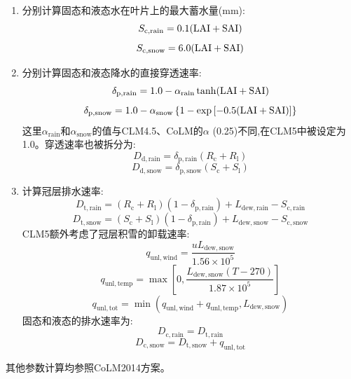 \begin{enumerate}
  \item 分别计算固态和液态水在叶片上的最大蓄水量(mm):
    \begin{equation}
      S_{\mathrm{c,rain}}=0.1({\rm LAI}+{\rm SAI})
    \end{equation}
    \begin{equation}
      S_{\mathrm{c,snow}}=6.0({\rm LAI}+{\rm SAI})
    \end{equation}
  \item 分别计算固态和液态降水的直接穿透速率:
    \begin{equation}
      \delta_{\mathrm{p,rain}}=1.0 - \alpha_{\mathrm{rain}} \tanh({\rm LAI}+{\rm SAI})
    \end{equation}
    \begin{equation}
      \delta_{\mathrm{p,snow}}=1.0 - \alpha_{\mathrm{snow}}\left\{1-\exp\left[-0.5({\rm LAI}+{\rm SAI})\right]\right\}
    \end{equation}
    这里$\alpha_{\mathrm{rain}}$和$\alpha_{\mathrm{snow}}$的值与CLM4.5、CoLM的$\alpha$ (0.25)不同,在CLM5中被设定为1.0。穿透速率也被拆分为:
    \begin{equation}
      D_{\mathrm{d,rain}}=\delta_{\mathrm{p,rain}}(R_{\mathrm {c}} +R_{\mathrm{l}})
    \end{equation}
    \begin{equation}
      D_{\mathrm{d,snow}}=\delta_{\mathrm{p,snow}}(S_{\mathrm {c}} +S_{\mathrm{l}})
    \end{equation}
  \item 计算冠层排水速率:
    \begin{equation}
      D_{\mathrm {t,rain}}=(R_{\mathrm {c}} +R_{\mathrm{l}})(1-\delta_{\mathrm{p,rain}})+L_{\mathrm{dew,rain}}-S_{\mathrm{c,rain}}
    \end{equation}
    \begin{equation}
      D_{\mathrm {t,snow}}=(S_{\mathrm {c}} +S_{\mathrm{l}})(1-\delta_{\mathrm{p,rain}})+L_{\mathrm{dew,snow}}-S_{\mathrm{c,snow}}
    \end{equation}
    CLM5额外考虑了冠层积雪的卸载速率:
    \begin{equation}\label{q_unl_wind}
      q_{\mathrm{unl,wind}}=\frac{uL_{\mathrm{dew,snow}}}{1.56\times 10^5}
    \end{equation}
    \begin{equation}
      q_{\mathrm{unl,temp}}=\max\left[0, \frac{L_{\mathrm{dew,snow}}(T-270)}{1.87\times 10^5}\right]
    \end{equation}
    \begin{equation}\label{q_unl_tot}
      q_{\mathrm{unl,tot}}=\min(q_{\mathrm{unl,wind}}+q_{\mathrm{unl,temp}},L_{\mathrm{dew,snow}})
    \end{equation}
    固态和液态的排水速率为:
    \begin{equation}
      D_{\mathrm{c,rain}}=D_{\mathrm {t,rain}}
    \end{equation}
    \begin{equation}
      D_{\mathrm{c,snow}}=D_{\mathrm {t,snow}}+q_{\mathrm{unl,tot}}
    \end{equation}
\end{enumerate}
其他参数计算均参照CoLM2014方案。


